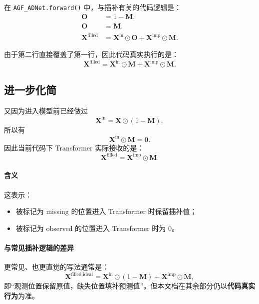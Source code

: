 \documentclass[UTF8]{ctexart}
\begin{document}
在 \texttt{AGF\_ADNet.forward()} 中，与插补有关的代码逻辑是：
\begin{align}
    \bm{O} &= 1 - \bm{M}, \\
    \bm{O} &= \bm{M}, \\
    \bm{X}^{\text{filled}} &= \bm{X}^{\text{in}} \odot \bm{O} + \bm{X}^{\text{imp}} \odot \bm{M}.
\end{align}

由于第二行直接覆盖了第一行，因此代码真实执行的是：
\begin{equation}
    \bm{X}^{\text{filled}} = \bm{X}^{\text{in}} \odot \bm{M} + \bm{X}^{\text{imp}} \odot \bm{M}.
\end{equation}

\subsection{进一步化简}

又因为进入模型前已经做过
\begin{equation}
    \bm{X}^{\text{in}} = \bm{X} \odot (1-\bm{M}),
\end{equation}
所以有
\begin{equation}
    \bm{X}^{\text{in}} \odot \bm{M} = \bm{0}.
\end{equation}
因此当前代码下 Transformer 实际接收的是：
\begin{equation}
    \bm{X}^{\text{filled}} = \bm{X}^{\text{imp}} \odot \bm{M}.
\end{equation}

\paragraph{含义}
这表示：
\begin{itemize}
    \item 被标记为 missing 的位置进入 Transformer 时保留插补值；
    \item 被标记为 observed 的位置进入 Transformer 时为 0。
\end{itemize}

\paragraph{与常见插补逻辑的差异}
更常见、也更直觉的写法通常是：
\begin{equation}
    \bm{X}^{\text{filled,ideal}}
    =
    \bm{X}^{\text{in}} \odot (1-\bm{M})
    +
    \bm{X}^{\text{imp}} \odot \bm{M},
\end{equation}
即“观测位置保留原值，缺失位置填补预测值”。但本文档在其余部分仍以\textbf{代码真实行为}为准。
\end{document}
